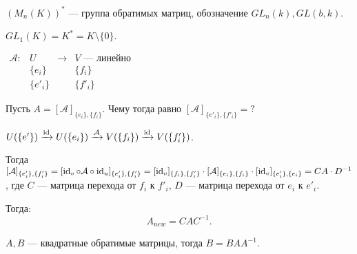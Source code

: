 $\left(M_n(K)\right)^*$ --- группа обратимых матриц, обозначение  $GL_n(k), GL(b, k)$.

\begin{example}
    $GL_1(K) = K^* = K \setminus \{0\}$.
\end{example}

$\begin{array}{llll} \mathcal{A}\!: & U & \to & V\text{ --- линейно} \\ & \{e_i\} && \{f_i\} \\ & \{e'_i\} && \{f'_i\} \end{array}$

Пусть  $A = [\mathcal{A}]_{\{e_i\}, \{f_i\}}$. Чему тогда равно  $[\mathcal{A}]_{\{e'_i\}, \{f'_i\}} = ?$

$U (\{e'\}) \xrightarrow{\operatorname{id}} U(\{e_i\}) \xrightarrow{\mathcal{A}} V (\{f_i\}) \xrightarrow{\operatorname{id}} V(\{f'_i\})$.

Тогда  $[\mathcal{A}]_{\{e'_i\}, \{f'_i\}} = [\operatorname{id}_v \circ \mathcal{A} \circ \operatorname{id}_u]_{\{e'_i\}, \{f'_i\}} = [\operatorname{id}_v]_{\{f_i\}, \{f'_i\}} \cdot [\mathcal{A}]_{\{e_i\}, \{f_i\}} \cdot [\operatorname{id}_v]_{\{e'_i\}, \{e_i\}} = C A \cdot D^{-1}$, где  $C$ --- матрица перехода от  $f_i$ к  $f'_i$,  $D$ --- матрица перехода  от $e_i$ к  $e'_i$.

Тогда:  \[
    A_{new} = C A C^{-1}
.\]

$A, B$ --- квадратные обратимые матрицы, тогда  $B = B A A^{-1}$.

